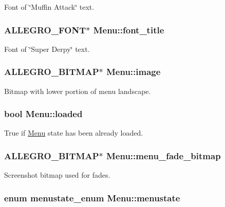 \-Font of \char`\"{}\-Muffin Attack\char`\"{} text. \hypertarget{structMenu_aac0297cac51099ec75020a510a6dcbb3}{
\subsubsection[{font\-\_\-title}]{\setlength{\rightskip}{0pt plus 5cm}\-A\-L\-L\-E\-G\-R\-O\-\_\-\-F\-O\-N\-T$\ast$ {\bf \-Menu\-::font\-\_\-title}}}\label{structMenu_aac0297cac51099ec75020a510a6dcbb3}
\-Font of \char`\"{}\-Super Derpy\char`\"{} text. \hypertarget{structMenu_a7ac035a3356434a3ce6eae45f876eba9}{
\subsubsection[{image}]{\setlength{\rightskip}{0pt plus 5cm}\-A\-L\-L\-E\-G\-R\-O\-\_\-\-B\-I\-T\-M\-A\-P$\ast$ {\bf \-Menu\-::image}}}\label{structMenu_a7ac035a3356434a3ce6eae45f876eba9}
\-Bitmap with lower portion of menu landscape. \hypertarget{structMenu_afd245b822f2805677609fc0f78ee59ac}{
\subsubsection[{loaded}]{\setlength{\rightskip}{0pt plus 5cm}bool {\bf \-Menu\-::loaded}}}\label{structMenu_afd245b822f2805677609fc0f78ee59ac}
\-True if \hyperlink{structMenu}{\-Menu} state has been already loaded. \hypertarget{structMenu_a4d3a2c17b2882c7adf10a15ba49932b4}{
\subsubsection[{menu\-\_\-fade\-\_\-bitmap}]{\setlength{\rightskip}{0pt plus 5cm}\-A\-L\-L\-E\-G\-R\-O\-\_\-\-B\-I\-T\-M\-A\-P$\ast$ {\bf \-Menu\-::menu\-\_\-fade\-\_\-bitmap}}}\label{structMenu_a4d3a2c17b2882c7adf10a15ba49932b4}
\-Screenshot bitmap used for fades. \hypertarget{structMenu_a6c264952ac073cf2f290de86a677c876}{
\subsubsection[{menustate}]{\setlength{\rightskip}{0pt plus 5cm}enum {\bf menustate\-\_\-enum} {\bf \-Menu\-::menustate}}}\label{structMenu_a6c264952ac073cf2f290de86a677c876}
